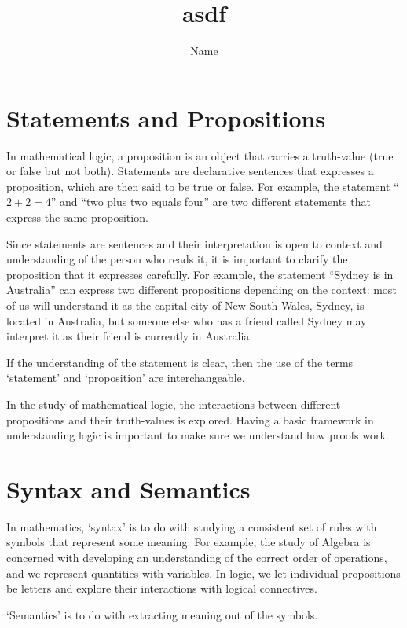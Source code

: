 \documentclass[11pt, a4paper, oneside]{exam}
\title{asdf}
\author{Name
}
\date{}
\theoremstyle{definition}\newtheorem{define}{Definition}[section]
\theoremstyle{remark}\newtheorem{remark}{Remark}
\theoremstyle{definition}\newtheorem{example}{Example}[subsection]
\theoremstyle{definition}\newtheorem{notation}{Notation}[section]
\theoremstyle{definition}\newtheorem{theorem}{Theorem}[section]
\theoremstyle{definition}\newtheorem{corollary}{Corollary}[section]
\begin{document}
%
%

\section{Statements and Propositions}

In mathematical logic, a proposition is an object that carries a truth-value (true or false but not both). Statements are declarative sentences that expresses a proposition, which are then said to be true or false.
For example, the statement ``$2+2=4$'' and ``two plus two equals four'' are two different statements that express the same proposition. 

Since statements are sentences and their interpretation is open to context and understanding of the person who reads it, it is important to clarify the proposition that it expresses carefully.
For example, the statement ``Sydney is in Australia'' can express two different propositions depending on the context: most of us will understand it as the capital city of New South Wales, Sydney, is located in Australia, but someone else who has a friend called Sydney may interpret it as their friend is currently in Australia.

If the understanding of the statement is clear, then the use of the terms `statement' and `proposition' are interchangeable.

In the study of mathematical logic, the interactions between different propositions and their truth-values is explored. Having a basic framework in understanding logic is important to make sure we understand how proofs work.

\section{Syntax and Semantics}

In mathematics, `syntax' is to do with studying a consistent set of rules with symbols that represent some meaning. For example, the study of Algebra is concerned with developing an understanding of the correct order of operations, and we represent quantities with variables. In logic, we let individual propositions be letters and explore their interactions with logical connectives.

`Semantics' is to do with extracting meaning out of the symbols.
\end{document}
